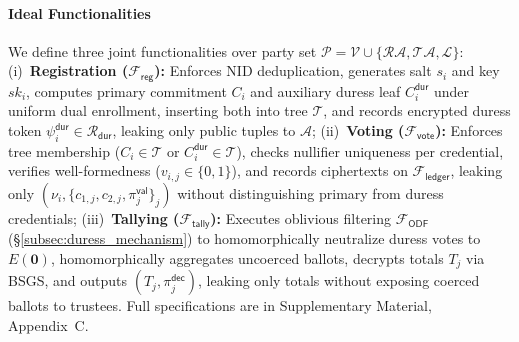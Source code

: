 \documentclass[10pt,letterpaper,journal]{IEEEtran}
\begin{document}
\paragraph{Ideal Functionalities}
We define three joint functionalities over party set $\mathcal{P} = \mathcal{V} \cup \{\mathcal{RA}, \mathcal{TA}, \mathcal{L}\}$:
(i)~\textbf{Registration ($\mathcal{F}_{\mathsf{reg}}$):} Enforces NID deduplication, generates salt $s_i$ and key $sk_i$, computes primary commitment $C_i$ and auxiliary duress leaf $C_i^{\mathsf{dur}}$ under uniform dual enrollment, inserting both into tree $\mathcal{T}$, and records encrypted duress token $\psi_i^{\mathsf{dur}} \in \mathcal{R}_{\mathsf{dur}}$, leaking only public tuples to $\mathcal{A}$;
(ii)~\textbf{Voting ($\mathcal{F}_{\mathsf{vote}}$):} Enforces tree membership ($C_i \in \mathcal{T}$ or $C_i^{\mathsf{dur}} \in \mathcal{T}$), checks nullifier uniqueness per credential, verifies well-formedness ($v_{i,j} \in \{0,1\}$), and records ciphertexts on $\mathcal{F}_{\mathsf{ledger}}$, leaking only $(\nu_i, \{c_{1,j}, c_{2,j}, \pi_j^{\mathsf{val}}\}_j)$ without distinguishing primary from duress credentials;
(iii)~\textbf{Tallying ($\mathcal{F}_{\mathsf{tally}}$):} Executes oblivious filtering $\mathcal{F}_{\mathsf{ODF}}$ (\S\ref{subsec:duress_mechanism}) to homomorphically neutralize duress votes to $E(\mathbf{0})$, homomorphically aggregates uncoerced ballots, decrypts totals $T_j$ via BSGS, and outputs $(T_j, \pi_j^{\mathsf{dec}})$, leaking only totals without exposing coerced ballots to trustees. Full specifications are in Supplementary Material, Appendix~C.
\end{document}
